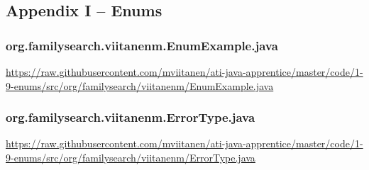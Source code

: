 \subsection*{Appendix I -- Enums} \label{App:AppendixI}

\subsubsection*{org.familysearch.viitanenm.EnumExample.java}\label{App:AppendixIExample}
\noindent
\begin{minipage}{.6in}
\end{minipage}
\begin{minipage}{6in}
  \url{https://raw.githubusercontent.com/mviitanen/ati-java-apprentice/master/code/1-9-enums/src/org/familysearch/viitanenm/EnumExample.java}
\end{minipage}

\vspace{1em}
\subsubsection*{org.familysearch.viitanenm.ErrorType.java}\label{App:AppendixIEnum}
\noindent
\begin{minipage}{.6in}
\end{minipage}
\begin{minipage}{6in}
  \url{https://raw.githubusercontent.com/mviitanen/ati-java-apprentice/master/code/1-9-enums/src/org/familysearch/viitanenm/ErrorType.java}
\end{minipage}
